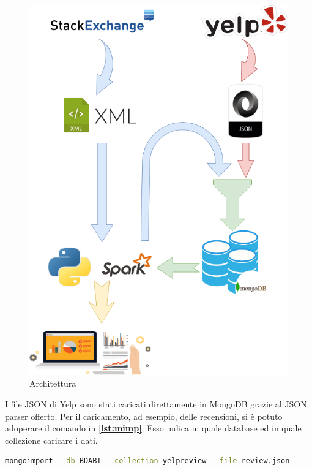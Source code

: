 \begin{figure}[H]
	\centering
	\includegraphics[scale=0.5]{image/BDABI.png}
	\caption{Architettura}
	\label{fig:arc}
\end{figure}
I file JSON di Yelp sono stati caricati direttamente in MongoDB grazie al JSON parser offerto.
Per il caricamento, ad esempio, delle recensioni, si è potuto adoperare il comando in \textbf{\ref{lst:mimp}}. Esso indica in quale database ed in quale collezione caricare i dati.\par

\begin{lstlisting}[language=Bash, caption={Yelp Dataset Loading}, captionpos=b, label={lst:mimp}]
mongoimport --db BDABI --collection yelpreview --file review.json
\end{lstlisting}
 
